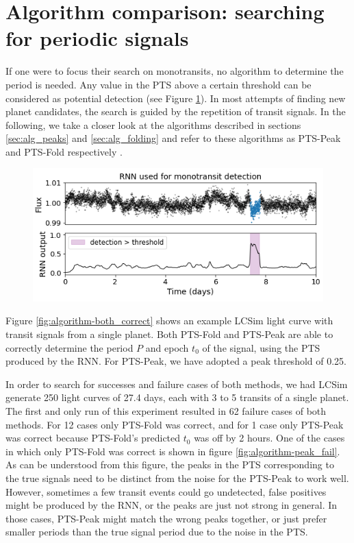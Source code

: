 
\section{Algorithm comparison: searching for periodic signals}
\label{sec:exp_algorithm}

If one were to focus their search on monotransits, no algorithm to determine the period is needed. Any value in the PTS above a certain threshold can be considered as potential detection (see Figure \ref{fig:algorithm-mono_example}). In most attempts of finding new planet candidates, the search is guided by the repetition of transit signals. In the following, we take a closer look at the algorithms described in sections \ref{sec:alg_peaks} and \ref{sec:alg_folding} and refer to these algorithms as PTS-Peak and PTS-Fold respectively .

\begin{figure}
    \centering
    \includegraphics[width=0.6\linewidth]{Experiments/Figures/Algorithm/mono_example.png}
    \caption{}
    \label{fig:algorithm-mono_example}
\end{figure}

Figure \ref{fig:algorithm-both_correct} shows an example LCSim light curve with transit signals from a single planet. Both PTS-Fold and PTS-Peak are able to correctly determine the period $P$ and epoch $t_0$ of the signal, using the PTS produced by the RNN. For PTS-Peak, we have adopted a peak threshold of 0.25. 

In order to search for successes and failure cases of both methods, we had LCSim generate 250 light curves of 27.4 days, each with 3 to 5 transits of a single planet. The first and only run of this experiment resulted in 62 failure cases of both methods. For 12 cases only PTS-Fold was correct, and for 1 case only PTS-Peak was correct because PTS-Fold's predicted $t_0$ was off by 2 hours. One of the cases in which only PTS-Fold was correct is shown in figure \ref{fig:algorithm-peak_fail}. As can be understood from this figure, the peaks in the PTS corresponding to the true signals need to be distinct from the noise for the PTS-Peak to work well. However, sometimes a few transit events could go undetected, false positives might be produced by the RNN, or the peaks are just not strong in general. In those cases, PTS-Peak might match the wrong peaks together, or just prefer smaller periods than the true signal period due to the noise in the PTS.

